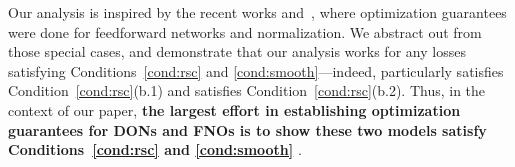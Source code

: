 
Our analysis is inspired by the recent works \citep{banerjee2022restricted} and~\citep{cisnerosvelarde2024optgenWeightNorm}, where optimization guarantees were done for feedforward networks and normalization. We abstract out from those special cases, and demonstrate that our analysis works for any losses satisfying Conditions~\ref{cond:rsc} and \ref{cond:smooth}---indeed, \citep{cisnerosvelarde2024optgenWeightNorm} particularly satisfies Condition~\ref{cond:rsc}(b.1) and   \citep{banerjee2022restricted} satisfies Condition~\ref{cond:rsc}(b.2). Thus, in the context of our paper, \textbf{the largest effort in %
establishing optimization guarantees for DONs and FNOs is to show these two models satisfy Conditions~\ref{cond:rsc} and \ref{cond:smooth} }.